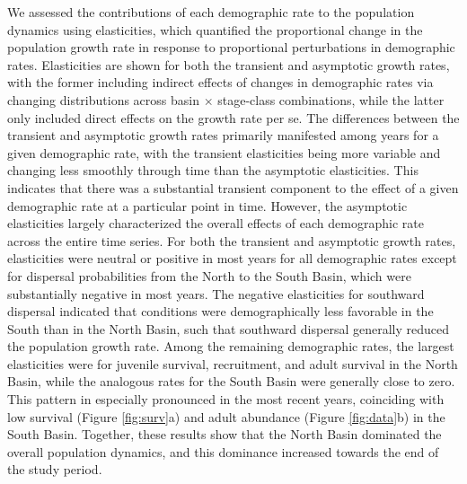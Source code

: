 \documentclass[11pt]{article}
\begin{document}
We assessed the contributions of each demographic rate to the population dynamics
using elasticities,
which quantified the proportional change in the population growth rate in 
response to proportional perturbations in demographic rates.
Elasticities are shown for both the transient and asymptotic growth rates,
with the former including indirect effects of changes in demographic rates
via changing distributions across basin $\times$ stage-class combinations, 
while the latter only included direct effects on the growth rate per se.
The differences between the transient and asymptotic growth rates primarily manifested
among years for a given demographic rate,
with the transient elasticities being more variable and changing less smoothly through time
than the asymptotic elasticities.
This indicates that there was a substantial transient component to the effect of a 
given demographic rate at a particular point in time.
However, the asymptotic elasticities largely characterized the overall
effects of each demographic rate across the entire time series.
For both the transient and asymptotic growth rates, 
elasticities were neutral or positive in most years for all demographic rates 
except for dispersal probabilities from the North to the South Basin,
which were substantially negative in most years.
The negative elasticities for southward dispersal indicated that conditions were 
demographically less favorable in the South than in the North Basin,
such that southward dispersal generally reduced the population growth rate.
Among the remaining demographic rates,
the largest elasticities were for juvenile survival, recruitment, and adult survival
in the North Basin, while the analogous rates for the South Basin were generally close to zero.
This pattern in especially pronounced in the most recent years,
coinciding with low survival (Figure \ref{fig:surv}a) 
and adult abundance (Figure \ref{fig:data}b) in the South Basin.
Together, these results show that the North Basin dominated 
the overall population dynamics, 
and this dominance increased towards the end of the study period.





\end{document}
